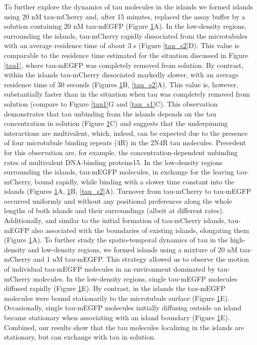 \begin{figure}[h!]
{	}\label{tau2}
\end{figure}
To further explore the dynamics of tau molecules in the islands we formed islands using 20 nM tau-mCherry and, after 15 minutes, replaced the assay buffer by a solution containing 20 nM tau-mEGFP (Figure \ref{tau2}A). In the low-density regions, surrounding the islands, tau-mCherry rapidly dissociated from the microtubules with an average residence time of about 3 s (Figure \ref{tau_s2}D). This value is comparable to the residence time estimated for the situation discussed in Figure \ref{tau1}, where tau-mEGFP was completely removed from solution. By contrast, within the islands tau-mCherry dissociated markedly slower, with an average residence time of 30 seconds (Figures \ref{tau2}B, \ref{tau_s2}A). This value is, however, substantially faster than in the situation when tau was completely removed from solution (compare to Figure \ref{tau1}G and \ref{tau_s1}C). This observation demonstrates that tau unbinding from the islands depends on the tau concentration in solution (Figure \ref{tau2}C) and suggests that the underpinning interactions are multivalent, which, indeed, can be expected due to the presence of four microtubule binding repeats (4R) in the 2N4R tau molecules. Precedent for this observation are, for example, the concentration-dependent unbinding rates of multivalent DNA-binding proteins15. In the low-density regions surrounding the islands, tau-mEGFP molecules, in exchange for the leaving tau-mCherry, bound rapidly, while binding with a slower time constant into the islands (Figures \ref{tau2}A, \ref{tau2}B, \ref{tau_s2}A). Turnover from tau-mCherry to tau-mEGFP occurred uniformly and without any positional preferences along the whole lengths of both islands and their surroundings (albeit at different rates). Additionally, and similar to the initial formation of tau-mCherry islands, tau-mEGFP also associated with the boundaries of existing islands, elongating them (Figure \ref{tau2}A). To further study the spatio-temporal dynamics of tau in the high-density and low-density regions, we formed islands using a mixture of 20 nM tau-mCherry and 1 nM tau-mEGFP. This strategy allowed us to observe the motion of individual tau-mEGFP molecules in an environment dominated by tau-mCherry molecules. In the low-density regions, single tau-mEGFP molecules diffused rapidly (Figure \ref{tau2}E). By contrast, in the islands the tau-mEGFP molecules were bound stationarily to the microtubule surface (Figure \ref{tau2}E). Occasionally, single tau-mEGFP molecules initially diffusing outside an island became stationary when associating with an island boundary (Figure \ref{tau2}E). Combined, our results show that the tau molecules localizing in the islands are stationary, but can exchange with tau in solution.

